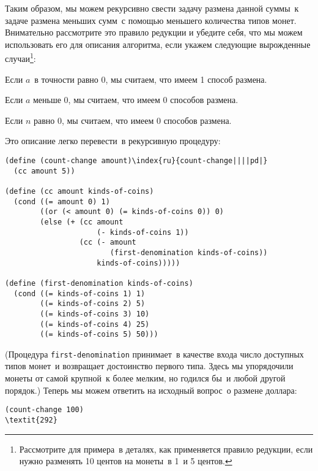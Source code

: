 Таким образом, мы можем рекурсивно свести задачу размена
данной суммы~к задаче размена меньших сумм~с помощью меньшего
количества типов монет.  Внимательно рассмотрите это правило редукции
и убедите себя, что мы можем использовать его для описания алгоритма,
если укажем следующие вырожденные случаи\footnote{Рассмотрите для примера~в деталях, как применяется правило
редукции, если нужно разменять 10 центов на монеты~в 1~и 5 центов.
}:

\begin{plainlist}


\item
Если $a$~в точности равно 0, мы считаем, 
что имеем 1 способ размена.

\item
Если $a$ меньше 0, мы считаем, что имеем 
0 способов размена.

\item
Если $n$ равно 0, мы считаем, что имеем
0 способов размена.
\end{plainlist}
Это описание легко перевести~в рекурсивную процедуру:

\begin{Verbatim}[fontsize=\small]
(define (count-change amount)\index{ru}{count-change||||pd|}
  (cc amount 5))

(define (cc amount kinds-of-coins)
  (cond ((= amount 0) 1)
        ((or (< amount 0) (= kinds-of-coins 0)) 0)
        (else (+ (cc amount
                     (- kinds-of-coins 1))
                 (cc (- amount
                        (first-denomination kinds-of-coins))
                     kinds-of-coins)))))

(define (first-denomination kinds-of-coins)
  (cond ((= kinds-of-coins 1) 1)
        ((= kinds-of-coins 2) 5)
        ((= kinds-of-coins 3) 10)
        ((= kinds-of-coins 4) 25)
        ((= kinds-of-coins 5) 50)))
\end{Verbatim}
(Процедура {\tt first-denomination} принимает~в качестве входа
число доступных типов монет~и возвращает достоинство первого
типа. Здесь мы упорядочили монеты от самой крупной~к более мелким, но
годился бы~и любой другой порядок.)  Теперь мы можем ответить на
исходный вопрос~о размене доллара:

\begin{Verbatim}[fontsize=\small]
(count-change 100)
\textit{292}
\end{Verbatim}

